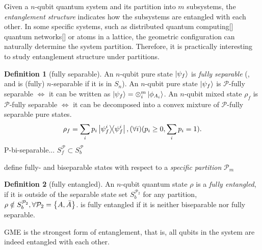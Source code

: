 \documentclass[
aps,
pra,
floatfix,
]{revtex4-2}
\theoremstyle{plain}
\theoremstyle{definition}
\newtheorem{definition}{Definition}
\newcommand{\separable}{S}
\newcommand{\ppartition}{\mathcal{P}}
\newcommand{\dm}{\rho}
\begin{document}
Given a $n$-qubit quantum system and its partition into $m$ subsystems, the \emph{entanglement structure} indicates how the subsystems are entangled with each other.
In some specific systems, such as distributed quantum computing[] quantum networks[] or atoms in a lattice, the geometric configuration can naturally determine the system partition.
Therefore, it is practically interesting to study entanglement structure under partitions.
\begin{definition}[fully separable]\label{def:fully_separable}
	An $n$-qubit pure state $\ket{\psi_f}$ is \emph{fully separable} \iff (, and is (fully) $n$-separable if it is in $S_n$).
	An $n$-qubit pure state $\ket{\psi_f}$ is $\ppartition$-fully separable $\iff$ it can be written as 
	$\ket{\psi_f}=\otimes_i^m \ket{\phi_{A_i}}$.
	An $n$-qubit mixed state $\dm_f$ is $\ppartition$-fully separable $\iff$ it can be decomposed into a convex mixture of $\ppartition$-fully separable pure states.
	\begin{equation}
		\dm_f = \sum_i p_i \op{\psi_f^i}, (\forall i) ( p_i\ge 0, \sum_i p_i = 1) .
	\end{equation}
	P-bi-separable... $\separable_f^\ppartition \subset S_b^\ppartition$
\end{definition}
define fully- and biseparable states with respect to a \emph{specific partition} $\ppartition_m$
\begin{definition}[fully entangled]\label{def:fully_entangled}
	An $n$-qubit quantum state $\dm$ is a \emph{fully entangled},
	if it is outside of the separable state set $S_b^{\ppartition_2}$ for any partition,
	$\dm \notin S_b^{\ppartition_2},\forall \ppartition_2 = \qty{A,\bar{A}}$.
	is fully entangled if it is neither biseparable nor fully separable.
\end{definition}
GME is the strongest form of entanglement, that is, 
all qubits in the system are indeed entangled with each other.
\end{document}
